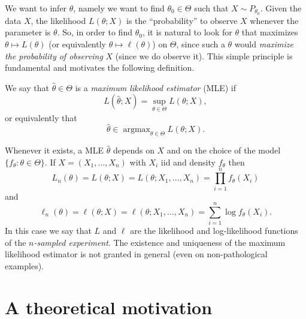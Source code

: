\documentclass[
	fontsize=11pt, %
	twoside=false, %
	numbers=noenddot, %
]{kaobook}
\DeclareMathOperator*{\argmax}{argmax}
\newcommand{\wh}{\widehat}
\begin{document}
We want to infer $\theta$, namely we want to find $\theta_0 \in \Theta$ such that $X \sim P_{\theta_0}$.
Given the data $X$, the likelihood $L(\theta; X)$ is the ``probability'' to observe $X$ whenever the parameter is $\theta$. 
So, in order to find $\theta_0$, it is natural to look for $\theta$ that maximizes $\theta \mapsto L(\theta)$ (or equivalently $\theta \mapsto \ell(\theta)$) on $\Theta$, since such a $\theta$ would \emph{maximize the probability of observing} $X$ (since we do observe it).
This simple principle is fundamental and motivates the following definition.
\begin{definition}
	We say that $\wh \theta \in \Theta$ is a \emph{maximum likelihood estimator} (MLE) if
	\begin{equation*}
		L(\wh \theta; X) = \sup_{\theta \in \Theta} L(\theta; X),
	\end{equation*}
	or equivalently that
	\begin{equation*}
		\wh \theta \in \argmax_{\theta \in \Theta} L(\theta; X).
	\end{equation*}
\end{definition}
Whenever it exists, a MLE $\wh \theta$ depends on $X$ and on the choice of the model $\{ f_\theta : \theta \in \Theta \}$.
If $X = (X_1, \ldots, X_n)$ with $X_i$ iid and density $f_\theta$ then
\begin{equation*}
	L_n(\theta) = L(\theta; X) = L(\theta; X_1, \ldots, X_n) = \prod_{i=1}^n f_\theta(X_i)
\end{equation*}
and
\begin{equation*}
	\ell_n(\theta) = \ell(\theta; X) = \ell(\theta; X_1, \ldots, X_n) = \sum_{i=1}^n \log f_\theta(X_i).
\end{equation*}
In this case we say that $L$ and $\ell$ are the likelihood and log-likelihood functions of the \emph{$n$-sampled experiment}.
The existence and uniqueness of the maximum likelihood estimator is not granted in general (even on non-pathological examples).%

\section{A theoretical motivation} %
\label{sec:a_theoretical_motivation}
\end{document}

